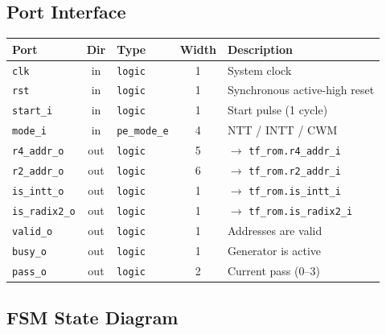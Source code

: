 \documentclass[11pt,a4paper]{article}
\newcommand{\sv}[1]{\texttt{#1}}
\newcommand{\port}[1]{\texttt{#1}}
\begin{document}
\subsection{Port Interface}

\begin{center}
\renewcommand{\arraystretch}{1.3}
\begin{tabular}{lclcp{7cm}}
  \toprule
  \textbf{Port} & \textbf{Dir} & \textbf{Type} & \textbf{Width} & \textbf{Description} \\
  \midrule
  \port{clk}          & in  & \sv{logic}    & 1  & System clock \\
  \port{rst}          & in  & \sv{logic}    & 1  & Synchronous active-high reset \\
  \port{start\_i}     & in  & \sv{logic}    & 1  & Start pulse (1 cycle) \\
  \port{mode\_i}      & in  & \sv{pe\_mode\_e}& 4 & NTT / INTT / CWM \\
  \midrule
  \port{r4\_addr\_o}  & out & \sv{logic}    & 5  & $\to$ \port{tf\_rom.r4\_addr\_i} \\
  \port{r2\_addr\_o}  & out & \sv{logic}    & 6  & $\to$ \port{tf\_rom.r2\_addr\_i} \\
  \port{is\_intt\_o}  & out & \sv{logic}    & 1  & $\to$ \port{tf\_rom.is\_intt\_i} \\
  \port{is\_radix2\_o}& out & \sv{logic}    & 1  & $\to$ \port{tf\_rom.is\_radix2\_i} \\
  \port{valid\_o}     & out & \sv{logic}    & 1  & Addresses are valid \\
  \port{busy\_o}      & out & \sv{logic}    & 1  & Generator is active \\
  \port{pass\_o}      & out & \sv{logic}    & 2  & Current pass (0--3) \\
  \bottomrule
\end{tabular}
\end{center}

\subsection{FSM State Diagram}
\end{document}
